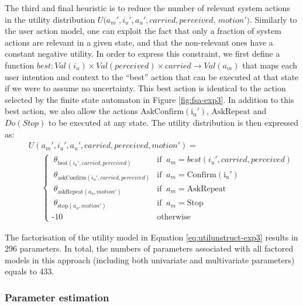 The third and final heuristic is to reduce the number of relevant system actions in the utility distribution $U(a_m', i_u', a_u', \mathit{carried}, \mathit{perceived}$, $\mathit{motion'})$.  Similarly to the user action model, one can exploit the fact that only a fraction of system actions are relevant in a given state, and that the non-relevant ones have a constant negative utility. In order to express this constraint, we first define a function $best: \mathit{Val}(i_u) \times \mathit{Val}(\mathit{perceived}) \times \mathit{carried} \rightarrow \mathit{Val}(a_m)$ that maps each user intention and context to the ``best'' action that can be executed at that state if we were to assume no uncertainty. This best action is identical to the action selected by the finite state automaton in Figure \ref{fig:fsa-exp3}. In addition to this best action, we also allow the actions $\mathrm{AskConfirm(i_u')}$, $\mathrm{AskRepeat}$ and $Do(Stop)$ to be executed at any state. The utility distribution is then expressed as: 
\begin{align}
&&& U(a_m', i_u', a_u', \mathit{carried}, \mathit{perceived}, \mathit{motion'}) = \nonumber \\
&&& \ \ \ \ \ \ \  \begin{cases} \ \theta_{\text{best}(i_u', \mathit{carried}, \mathit{perceived})} & \text{if } \ a_m = best(i_u', \mathit{carried}, \mathit{perceived}) \\ 
\ \theta_{\text{askConfirm}(i_u', \mathit{carried}, \mathit{perceived})} & \text{if } \ a_m = \mathrm{Confirm(i_u')} \\
\ \theta_{\text{askRepeat}(a_u, \mathit{motion'})} & \text{if } \ a_m = \mathrm{AskRepeat} \\
\ \theta_{\text{stop}(a_u,\mathit{motion'})} & \text{if } \ a_m = \mathrm{Stop} \\ 
\mbox{-}10 & \text{otherwise}
\end{cases} \label{eq:utilunstruct-exp3}
\end{align}

The factorisation of the utility model in Equation \eqref{eq:utilunstruct-exp3} results in 296 parameters. In total, the numbers of parameters associated with all factored models in this approach (including both univariate and multivariate parameters) equals to 433.

\subsubsection*{Parameter estimation}

